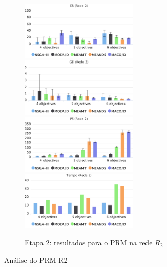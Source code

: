 \begin{figure}[!htbp]
	\caption{Etapa 2: resultados para o PRM na rede $R_2$}
	\label{fig_exp2_mrp_r2}
	\includegraphics[width=0.5\textwidth]{cap_experimentos/figs/etapa2/er-mrp-r2}
	\includegraphics[width=0.5\textwidth]{cap_experimentos/figs/etapa2/gd-mrp-r2}
	\includegraphics[width=0.5\textwidth]{cap_experimentos/figs/etapa2/ps-mrp-r2}
	\includegraphics[width=0.5\textwidth]{cap_experimentos/figs/etapa2/time-mrp-r2}
\end{figure}

Análise do PRM-R2

